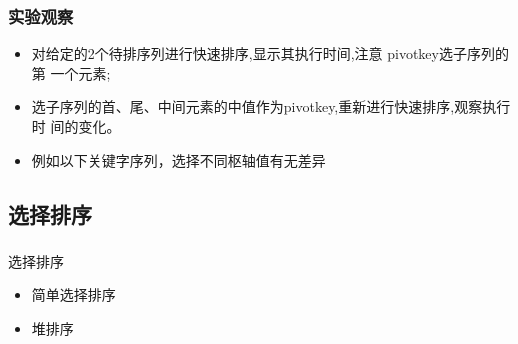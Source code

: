\begin{frame}[fragile]
  \frametitle{实验观察}
  \begin{itemize}
  \item 对给定的2个待排序列进行快速排序,显示其执行时间,注意 pivotkey选子序列的第
    一个元素;
  \item 选子序列的首、尾、中间元素的中值作为pivotkey,重新进行快速排序,观察执行时
    间的变化。
  \item 例如以下关键字序列，选择不同枢轴值有无差异
  \end{itemize}

  \begin{center}
  \end{center}
\end{frame}

\subsection{选择排序}
\begin{frame}[fragile]
  \frametitle{}
  \begin{sectionbox}{选择排序}
    \begin{itemize}
    \item 简单选择排序
    \item 堆排序
    \end{itemize}
  \end{sectionbox}
\end{frame}



